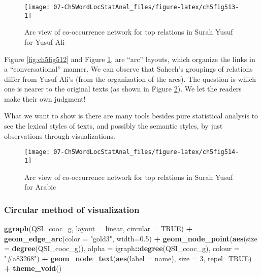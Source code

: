 \documentclass[
]{article}
\newenvironment{Shaded}{\begin{snugshade}}{\end{snugshade}}
\newcommand{\AttributeTok}[1]{\textcolor[rgb]{0.13,0.29,0.53}{#1}}
\newcommand{\ConstantTok}[1]{\textcolor[rgb]{0.56,0.35,0.01}{#1}}
\newcommand{\DecValTok}[1]{\textcolor[rgb]{0.00,0.00,0.81}{#1}}
\newcommand{\FloatTok}[1]{\textcolor[rgb]{0.00,0.00,0.81}{#1}}
\newcommand{\FunctionTok}[1]{\textcolor[rgb]{0.13,0.29,0.53}{\textbf{#1}}}
\newcommand{\NormalTok}[1]{#1}
\newcommand{\SpecialCharTok}[1]{\textcolor[rgb]{0.81,0.36,0.00}{\textbf{#1}}}
\newcommand{\StringTok}[1]{\textcolor[rgb]{0.31,0.60,0.02}{#1}}
\begin{document}
\begin{figure}

{\centering \texttt{[image: 07-Ch5WordLocStatAnal\_files/figure-latex/ch5fig513-1]} 

}

\caption{Arc view of co-occurrence network for top relations in Surah Yusuf for Yusuf Ali}\label{fig:ch5fig513}
\end{figure}

Figure \ref{fig:ch5fig512} and Figure \ref{fig:ch5fig513}, are ``arc'' layouts, which organize the links in a ``conversational'' manner. We can observe that Saheeh's groupings of relations differ from Yusuf Ali's (from the organization of the arcs). The question is which one is nearer to the original texts (as shown in Figure \ref{fig:ch5fig514}). We let the readers make their own judgment!

What we want to show is there are many tools besides pure statistical analysis to see the lexical styles of texts, and possibly the semantic styles, by just observations through visualizations.

\begin{figure}

{\centering \texttt{[image: 07-Ch5WordLocStatAnal\_files/figure-latex/ch5fig514-1]} 

}

\caption{Arc view of co-occurrence network for top relations in Surah Yusuf for Arabic}\label{fig:ch5fig514}
\end{figure}

\hypertarget{circular-method-of-visualization}{%
\subsubsection{Circular method of visualization}\label{circular-method-of-visualization}}

\begin{Shaded}
\begin{Highlighting}[]
\FunctionTok{ggraph}\NormalTok{(QSI\_cooc\_g, }\AttributeTok{layout =} \StringTok{\textquotesingle{}linear\textquotesingle{}}\NormalTok{, }\AttributeTok{circular =} \ConstantTok{TRUE}\NormalTok{) }\SpecialCharTok{+} 
     \FunctionTok{geom\_edge\_arc}\NormalTok{(}\AttributeTok{color =} \StringTok{"gold3"}\NormalTok{, }\AttributeTok{width=}\FloatTok{0.5}\NormalTok{) }\SpecialCharTok{+}
     \FunctionTok{geom\_node\_point}\NormalTok{(}\FunctionTok{aes}\NormalTok{(}\AttributeTok{size =} \FunctionTok{degree}\NormalTok{(QSI\_cooc\_g)), }
                     \AttributeTok{alpha =}\NormalTok{ igraph}\SpecialCharTok{::}\FunctionTok{degree}\NormalTok{(QSI\_cooc\_g), }
                     \AttributeTok{colour =} \StringTok{"\#a83268"}\NormalTok{) }\SpecialCharTok{+}
     \FunctionTok{geom\_node\_text}\NormalTok{(}\FunctionTok{aes}\NormalTok{(}\AttributeTok{label =}\NormalTok{ name), }\AttributeTok{size =} \DecValTok{3}\NormalTok{, }\AttributeTok{repel=}\ConstantTok{TRUE}\NormalTok{) }\SpecialCharTok{+}
     \FunctionTok{theme\_void}\NormalTok{()}
\end{Highlighting}
\end{Shaded}
\end{document}
